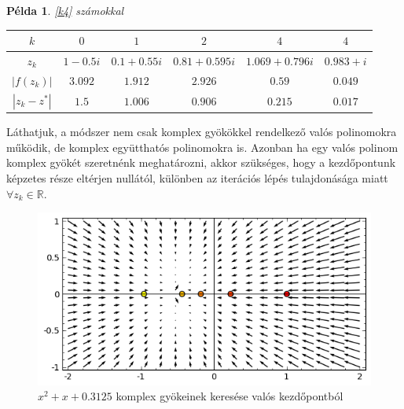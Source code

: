\documentclass[a4paper,12pt]{report}
\newtheorem{Pl}[Tet]{Példa}
\begin{document}
            \begin{Pl}
				\ref{k4} számokkal
				\begin{center}				
					\begin{tabular}{|c|c|c|c|c|c|}
						\hline
						$k$ & $0$ & $1$ & $2$ & $4$ & $4$ \\
						\hline
						$z_k$ & $1-0.5i$ & $0.1+0.55i$ & $0.81+0.595i$ & $1.069+0.796i$ & $0.983+i$ \\
						\hline
						$|f(z_k)|$ & $3.092$ & $1.912$ & $2.926$ & $0.59$ & $0.049$ \\
						\hline
						$|z_k-z^*|$ & $1.5$ & $1.006$ & $0.906$ & $0.215$ & $0.017$ \\
						\hline
					\end{tabular}
				\end{center}
            \end{Pl}
			Láthatjuk, a módszer nem csak komplex gyökökkel rendelkező valós polinomokra működik, de komplex együtthatós polinomokra is. Azonban ha egy valós polinom komplex gyökét szeretnénk meghatározni, akkor szükséges, hogy a kezdőpontunk képzetes része eltérjen nullától, különben az iterációs lépés tulajdonásága miatt $\forall z_k\in \mathbb{R}$.
            
            \begin{figure}[htp]
				\begin{center}
				\includegraphics[scale=0.62]{kep5.png}
				\caption{$x^2 + x + 0.3125$ komplex gyökeinek keresése valós kezdőpontból} \label{k5}
				\end{center}
			\end{figure}




    
\end{document}
